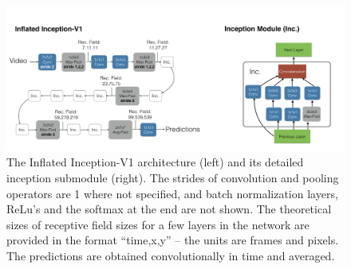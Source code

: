 \documentclass{article}
\begin{document}
\begin{figure}[h]
    \centering
    \includegraphics[width=0.9\linewidth]{figs/i3d.png}
    \caption{The Inflated Inception-V1 architecture (left) and its detailed inception submodule (right). The strides of convolution and pooling
operators are 1 where not specified, and batch normalization layers, ReLu’s and the softmax at the end are not shown. The theoretical
sizes of receptive field sizes for a few layers in the network are provided in the format “time,x,y” – the units are frames and pixels. The
predictions are obtained convolutionally in time and averaged.\cite{carreira2018quovadisactionrecognition}}
    \label{fig:i3d}
\end{figure}
\end{document}
